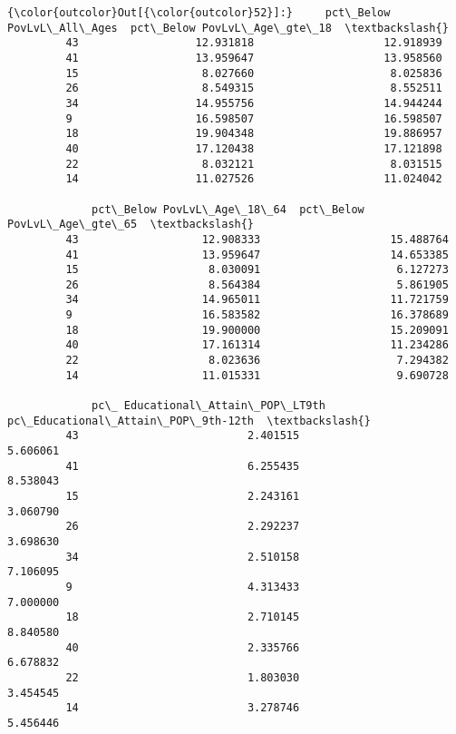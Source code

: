 \documentclass[11pt]{article}
\begin{document}
\begin{Verbatim}[commandchars=\\\{\}]
{\color{outcolor}Out[{\color{outcolor}52}]:}     pct\_Below PovLvL\_All\_Ages  pct\_Below PovLvL\_Age\_gte\_18  \textbackslash{}
         43                  12.931818                    12.918939   
         41                  13.959647                    13.958560   
         15                   8.027660                     8.025836   
         26                   8.549315                     8.552511   
         34                  14.955756                    14.944244   
         9                   16.598507                    16.598507   
         18                  19.904348                    19.886957   
         40                  17.120438                    17.121898   
         22                   8.032121                     8.031515   
         14                  11.027526                    11.024042   
         
             pct\_Below PovLvL\_Age\_18\_64  pct\_Below PovLvL\_Age\_gte\_65  \textbackslash{}
         43                   12.908333                    15.488764   
         41                   13.959647                    14.653385   
         15                    8.030091                     6.127273   
         26                    8.564384                     5.861905   
         34                   14.965011                    11.721759   
         9                    16.583582                    16.378689   
         18                   19.900000                    15.209091   
         40                   17.161314                    11.234286   
         22                    8.023636                     7.294382   
         14                   11.015331                     9.690728   
         
             pc\_ Educational\_Attain\_POP\_LT9th  pc\_Educational\_Attain\_POP\_9th-12th  \textbackslash{}
         43                          2.401515                            5.606061   
         41                          6.255435                            8.538043   
         15                          2.243161                            3.060790   
         26                          2.292237                            3.698630   
         34                          2.510158                            7.106095   
         9                           4.313433                            7.000000   
         18                          2.710145                            8.840580   
         40                          2.335766                            6.678832   
         22                          1.803030                            3.454545   
         14                          3.278746                            5.456446   
         

\end{Verbatim}
\end{document}
